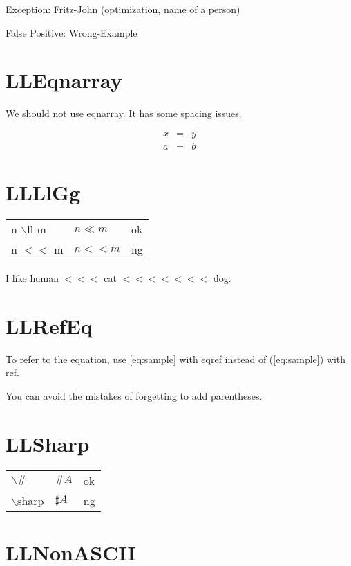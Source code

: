 \documentclass[a4paper, 10pt]{article}
\newcommand{\tA}[1]{\textcolor{cA}{#1}}
\newcommand{\tD}[1]{\textcolor{cD}{#1}}
\begin{document}
Exception: Fritz-John (optimization, name of a person)

False Positive: Wrong-Example

\section{LLEqnarray}

We should not use eqnarray. It has some spacing issues.

\begin{eqnarray}
	x & = & y \\
	a & = & b
\end{eqnarray}

\section{LLLlGg}

\begin{table}[H]
	\centering
	\begin{tabular}{lll}
		n $\backslash$ll m & $n \ll m$ & \tA{ok} \\
		n $<<$ m           & $n<<m$    & \tD{ng} \\
	\end{tabular}
\end{table}

I like human $<<<$ cat $<<<<<<<$ dog.

\section{LLRefEq}

To refer to the equation, use \eqref{eq:sample} with eqref instead of (\ref{eq:sample}) with ref.

You can avoid the mistakes of forgetting to add parentheses.

\section{LLSharp}

\begin{table}[H]
	\centering
	\begin{tabular}{lll}
		$\backslash\#$    & $\#A$      & \tA{ok} \\
		$\backslash$sharp & $\sharp A$ & \tD{ng}
	\end{tabular}
\end{table}

\section{LLNonASCII}
\end{document}
